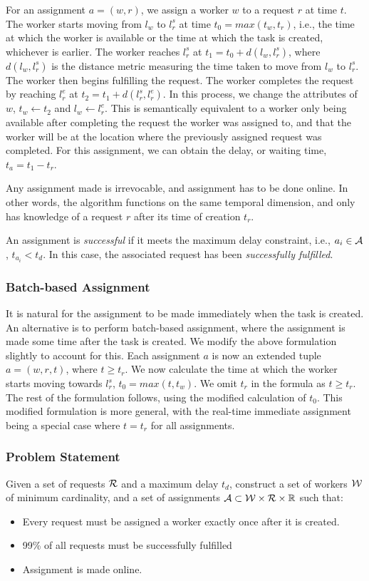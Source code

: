\documentclass[urop]{socreport}
\begin{document}
For an assignment $a = (w, r)$, we assign a worker $w$ to a request $r$ at time $t$. The worker starts moving from $l_w$ to $l_r^s$ at time $t_0 = max(t_w, t_r)$, i.e., the time at which the worker is available or the time at which the task is created, whichever is earlier. The worker reaches $l_r^s$ at $t_1 = t_0 + d(l_w, l_r^s)$, where $d(l_w, l_r^s)$ is the distance metric measuring the time taken to move from $l_w$ to $l_r^s$. The worker then begins fulfilling the request. The worker completes the request by reaching $l_r^e$ at $t_2 = t_1 + d(l_r^s, l_r^e)$. In this process, we change the attributes of $w$, $t_w \xleftarrow{} t_2$ and $l_w \xleftarrow{} l_r^e$. This is semantically equivalent to a worker only being available after completing the request the worker was assigned to, and that the worker will be at the location where the previously assigned request was completed. For this assignment, we can obtain the delay, or waiting time, $t_{a} = t_1 - t_r$.

Any assignment made is irrevocable, and assignment has to be done online. In other words, the algorithm functions on the same temporal dimension, and only has knowledge of a request $r$ after its time of creation $t_r$.

An assignment is \textit{successful} if it meets the maximum delay constraint, i.e., $a_i \in \mathcal{A}$, $t_{a_i} < t_d$. In this case, the associated request has been \textit{successfully fulfilled}.

\subsubsection{Batch-based Assignment}
It is natural for the assignment to be made immediately when the task is created. An alternative is to perform batch-based assignment, where the assignment is made some time after the task is created. We modify the above formulation slightly to account for this. Each assignment $a$ is now an extended tuple $a = (w,r,t)$, where $t \geq t_r$. We now calculate the time at which the worker starts moving towards $l_r^s$, $t_0 = max(t, t_w)$. We omit $t_r$ in the formula as $t \geq t_r$. The rest of the formulation follows, using the modified calculation of $t_0$. This modified formulation is more general, with the real-time immediate assignment being a special case where $t = t_r$ for all assignments.

\subsubsection{Problem Statement}
Given a set of requests $\mathcal{R}$ and a maximum delay $t_d$, construct a set of workers $\mathcal{W}$ of minimum cardinality, and a set of assignments $\mathcal{A} \subset \mathcal{W} \times \mathcal{R} \times \mathbb{R}$ such that:
\begin{itemize}
    \item Every request must be assigned a worker exactly once after it is created.
    \item 99\% of all requests must be successfully fulfilled
    \item Assignment is made online.
\end{itemize}
\end{document}

